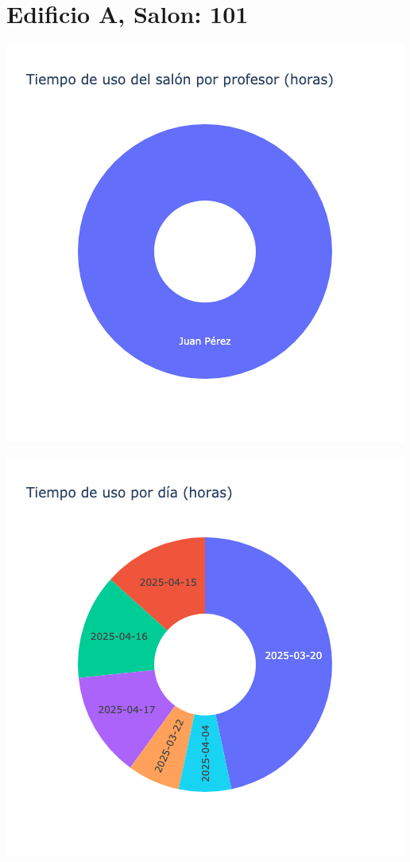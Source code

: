 \documentclass{article}
\begin{document}
    \section{Edificio A, Salon: 101}
    \noindent
    \begin{minipage}{0.48\textwidth}
        \centering
        \includegraphics[width=\textwidth]{../img/pie/UP101-180Dias-17-04-2025.png}
    \end{minipage}
    \hfill
    \begin{minipage}{0.48\textwidth}
        \centering
        \includegraphics[width=\textwidth]{../img/pie/UD101-180Dias-17-04-2025.png}
    \end{minipage}
    
\end{document}
